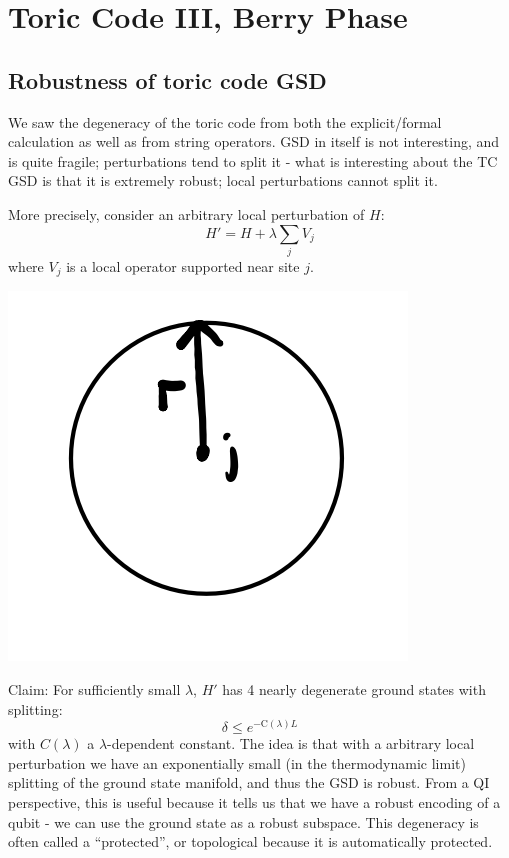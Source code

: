 \section{Toric Code III, Berry Phase}

\subsection{Robustness of toric code GSD}
We saw the degeneracy of the toric code from both the explicit/formal calculation as well as from string operators. GSD in itself is not interesting, and is quite fragile; perturbations tend to split it - what is interesting about the TC GSD is that it is extremely robust; local perturbations cannot split it.

More precisely, consider an arbitrary local perturbation of $H$:
\begin{equation}
    H' = H + \lambda\sum_j V_j
\end{equation}
where $V_j$ is a local operator supported near site $j$.

\begin{center}
    \includegraphics[scale=0.4]{Lectures/Images/lec3-local.png}
\end{center}

Claim: For sufficiently small $\lambda$, $H'$ has 4 nearly degenerate ground states with splitting:
\begin{equation}
    \delta \leq e^{-\text{C}(\lambda)L} 
\end{equation}
with $C(\lambda)$ a $\lambda$-dependent constant. The idea is that with a arbitrary local perturbation we have an exponentially small (in the thermodynamic limit) splitting of the ground state manifold, and thus the GSD is robust. From a QI perspective, this is useful because it tells us that we have a robust encoding of a qubit - we can use the ground state as a robust subspace. This degeneracy is often called a ``protected'', or topological because it is automatically protected.

